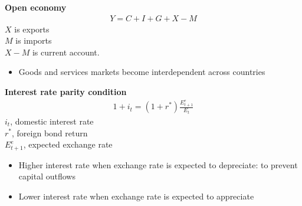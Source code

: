 \documentclass{beamer}
\begin{document}
\begin{frame}
  \textbf{Open economy}  
  \begin{align}
    Y=C+I+G+X-M
  \end{align}
  $X$ is exports\\
  $M$ is imports\\
  $X-M$ is current account.  
  \medskip
  \begin{itemize}
    \item Goods and services markets become interdependent across countries
  \end{itemize}
\end{frame}

\begin{frame}
  \textbf{Interest rate parity condition}
  \begin{align}
    1+i_t = (1+r^*) \frac{E^e_{t+1}}{E_t}
  \end{align}
  $i_t$, domestic interest rate\\
  $r^*$, foreign bond return\\
  $E^e_{t+1}$, expected exchange rate\\
  \begin{itemize}
    \item Higher interest rate when exchange rate is expected to depreciate: to prevent capital outflows
    \item Lower interest rate when exchange rate is expected to appreciate
  \end{itemize}
\end{frame}
\end{document}
